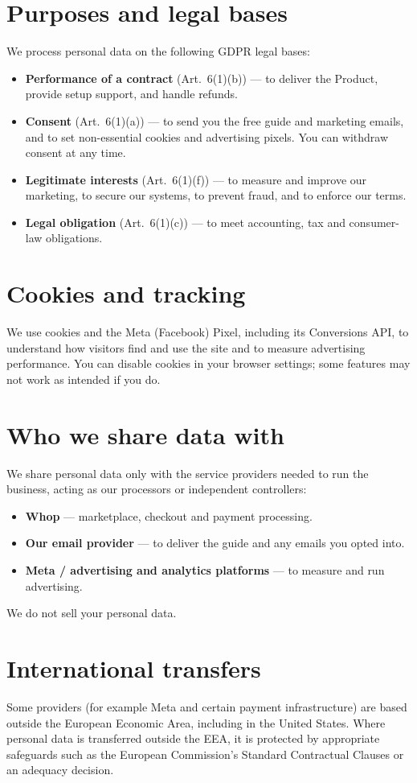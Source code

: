 \documentclass[11pt,a4paper]{article}
\begin{document}
\section{Purposes and legal bases}
We process personal data on the following GDPR legal bases:
\begin{itemize}
  \item \textbf{Performance of a contract} (Art.~6(1)(b)) --- to deliver the Product, provide setup
  support, and handle refunds.
  \item \textbf{Consent} (Art.~6(1)(a)) --- to send you the free guide and marketing emails, and to
  set non-essential cookies and advertising pixels. You can withdraw consent at any time.
  \item \textbf{Legitimate interests} (Art.~6(1)(f)) --- to measure and improve our marketing, to
  secure our systems, to prevent fraud, and to enforce our terms.
  \item \textbf{Legal obligation} (Art.~6(1)(c)) --- to meet accounting, tax and consumer-law
  obligations.
\end{itemize}

\section{Cookies and tracking}
We use cookies and the Meta (Facebook) Pixel, including its Conversions API, to understand how
visitors find and use the site and to measure advertising performance. You can disable cookies in
your browser settings; some features may not work as intended if you do.

\section{Who we share data with}
We share personal data only with the service providers needed to run the business, acting as our
processors or independent controllers:
\begin{itemize}
  \item \textbf{Whop} --- marketplace, checkout and payment processing.
  \item \textbf{Our email provider} --- to deliver the guide and any emails you opted into.
  \item \textbf{Meta / advertising and analytics platforms} --- to measure and run advertising.
\end{itemize}
We do not sell your personal data.

\section{International transfers}
Some providers (for example Meta and certain payment infrastructure) are based outside the European
Economic Area, including in the United States. Where personal data is transferred outside the EEA,
it is protected by appropriate safeguards such as the European Commission's Standard Contractual
Clauses or an adequacy decision.
\end{document}
